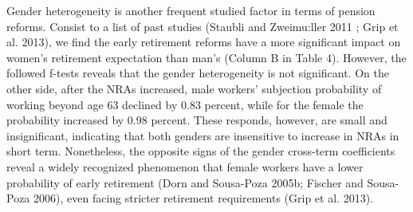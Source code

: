 \documentclass[a4paper]{article}
\begin{document}
Gender heterogeneity is another frequent studied factor in terms of pension reforms. Consist to a list of past studies (Staubli and Zweimu:ller 2011 ; Grip et al. 2013), we find the early retirement reforms have a more significant impact on women’s retirement expectation than man’s (Column B in Table 4). However, the followed f-tests reveals that the gender heterogeneity is not significant. On the other side, after the NRAs increased, male workers’ subjection probability of working beyond age 63 declined by 0.83 percent, while for the female the probability increased by 0.98 percent. These responds, however, are small and insignificant, indicating that both genders are insensitive to increase in NRAs in short term. Nonetheless, the opposite signs of the gender cross-term coefficients reveal a widely recognized phenomenon that female workers have a lower probability of early retirement (Dorn and Sousa-Poza 2005b; Fischer and Sousa-Poza 2006), even facing stricter retirement requirements (Grip et al. 2013). 
\end{document}
